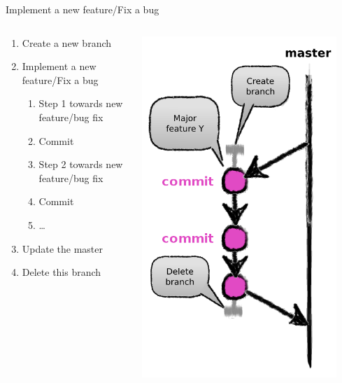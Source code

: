 \begin{frame}[fragile]{Implement a new feature/Fix a bug}
\begin{columns}
	\begin{column}{0.6\textwidth}
	\small
	\begin{enumerate}
		\item Create a new branch
		\item Implement a new feature/Fix a bug
		\begin{enumerate}
			\tiny
			\item Step 1 towards new feature/bug fix
			\item Commit
			\item Step 2 towards new feature/bug fix
			\item Commit
			\item \ldots
		\end{enumerate}
		\item Update the master
		\item Delete this branch 
	\end{enumerate}
	\end{column}
	\begin{column}{0.4\textwidth}
		\begin{center}
			\includegraphics[width=0.9\textwidth]{branch.png}

\end{center}
\end{column}
\end{columns}
\end{frame}
